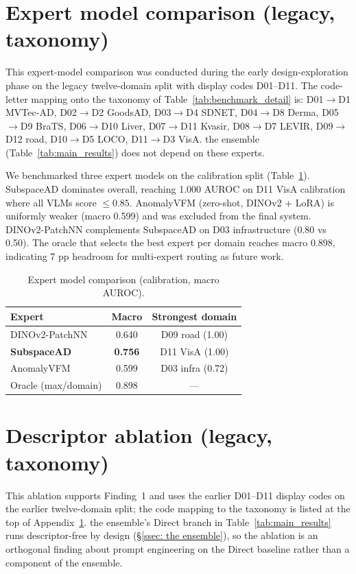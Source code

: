 \section{Expert model comparison (legacy,  taxonomy)}
\label{app:expert}

This expert-model comparison was conducted during the early design-exploration phase on the legacy twelve-domain split with display codes D01--D11. The code-letter mapping onto the taxonomy of Table~\ref{tab:benchmark_detail} is: D01$\to$D1 MVTec-AD, D02$\to$D2 GoodsAD, D03$\to$D4 SDNET, D04$\to$D8 Derma, D05$\to$D9 BraTS, D06$\to$D10 Liver, D07$\to$D11 Kvasir, D08$\to$D7 LEVIR, D09$\to$D12 road, D10$\to$D5 LOCO, D11$\to$D3 VisA.  the ensemble (Table~\ref{tab:main_results}) does not depend on these experts.

We benchmarked three expert models on the calibration split (Table~\ref{tab:expert_appendix}). SubspaceAD dominates overall, reaching 1.000 AUROC on D11 VisA calibration where all VLMs score $\leq 0.85$. AnomalyVFM (zero-shot, DINOv2 + LoRA) is uniformly weaker (macro 0.599) and was excluded from the final system. DINOv2-PatchNN complements SubspaceAD on D03 infrastructure (0.80 vs 0.50). The oracle that selects the best expert per domain reaches macro 0.898, indicating 7 pp headroom for multi-expert routing as future work.

\begin{table}[h]
\centering
\caption{Expert model comparison (calibration, macro AUROC).}
\label{tab:expert_appendix}
\small
\begin{tabular}{lcc}
\toprule
Expert & Macro & Strongest domain \\
\midrule
DINOv2-PatchNN & 0.640 & D09 road (1.00) \\
\textbf{SubspaceAD} & \textbf{0.756} & D11 VisA (1.00) \\
AnomalyVFM & 0.599 & D03 infra (0.72) \\
\midrule
Oracle (max/domain) & 0.898 & --- \\
\bottomrule
\end{tabular}
\end{table}

\section{Descriptor ablation (legacy,  taxonomy)}
\label{app:descriptor}

This ablation supports Finding~1 and uses the earlier D01--D11 display codes on the earlier twelve-domain split; the code mapping to the taxonomy is listed at the top of Appendix~\ref{app:expert}.  the ensemble's Direct branch in Table~\ref{tab:main_results} runs descriptor-free by design (\S\ref{ssec: the ensemble}), so the ablation is an orthogonal finding about prompt engineering on the Direct baseline rather than a component of  the ensemble.

